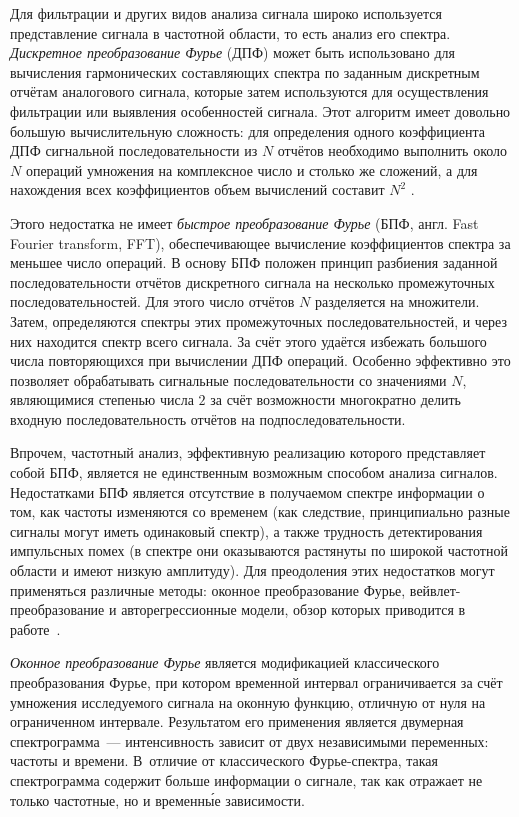 \documentclass[a4paper, 14pt, titlepage]{extarticle}
\newcommand{\eng}[1]{\foreignlanguage{english}{#1}}
\newcommand{\term}[1]{\emph{#1}}
\begin{document}
  Для фильтрации и других видов анализа сигнала широко используется представление сигнала в
  частотной области, то есть анализ его спектра. \term{Дискретное преобразование Фурье} (ДПФ) может быть использовано для вычисления
  гармонических составляющих спектра по заданным дискретным отчётам аналогового сигнала, которые
  затем используются для осуществления фильтрации или выявления особенностей сигнала. Этот
  алгоритм имеет довольно большую вычислительную сложность: для определения одного коэффициента ДПФ
  сигнальной последовательности из $N$ отчётов необходимо выполнить около $N$ операций умножения на
  комплексное число и столько же сложений, а для нахождения всех коэффициентов объем вычислений
  составит $N^2$ \cite{solonina-algorithms}.

  Этого недостатка не имеет \term{быстрое преобразование Фурье} (БПФ, англ. \eng{Fast Fourier transform, FFT}), обеспечивающее
  вычисление коэффициентов спектра за меньшее число операций. В основу БПФ положен принцип разбиения
  заданной последовательности отчётов дискретного сигнала на несколько промежуточных
  последовательностей. Для этого число отчётов $N$ разделяется на множители. Затем, определяются
  спектры этих промежуточных последовательностей, и через них находится спектр всего сигнала.
  За счёт этого удаётся избежать большого числа повторяющихся при вычислении ДПФ операций.
  Особенно эффективно это позволяет обрабатывать сигнальные последовательности со значениями
  $N$, являющимися степенью числа $2$ за счёт возможности многократно делить входную
  последовательность отчётов на подпоследовательности.

  Впрочем, частотный анализ, эффективную реализацию которого представляет собой БПФ, является не
  единственным возможным способом анализа сигналов. Недостатками БПФ является отсутствие в
  получаемом спектре информации о том, как частоты изменяются со временем (как следствие,
  принципиально разные сигналы могут иметь одинаковый спектр), а также трудность детектирования
  импульсных помех (в спектре они оказываются растянуты по широкой частотной области и имеют низкую
  амплитуду). Для преодоления этих недостатков могут применяться различные методы: оконное
  преобразование Фурье, вейвлет-преобразование и авторегрессионные модели, обзор которых приводится
  в работе~\cite{veggeberg-signal-processing}.

  \term{Оконное преобразование Фурье} является модификацией классического преобразования Фурье, при
  котором временной интервал ограничивается за счёт умножения исследуемого сигнала на оконную
  функцию, отличную от нуля на ограниченном интервале. Результатом его применения является двумерная
  спектрограмма~--- интенсивность зависит от двух независимыми переменных: частоты и времени.
  В~отличие от классического Фурье-спектра, такая спектрограмма содержит больше информации о
  сигнале, так как отражает не только частотные, но и временн\'{ы}е зависимости.
\end{document}
